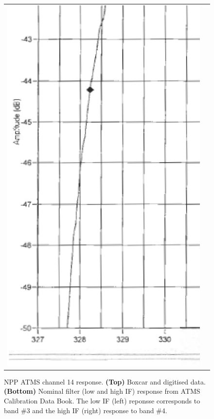 \begin{figure}[H]
\begin{tabular}{c c}
    \includegraphics[bb=249 194 1431 1035,scale=0.2]{graphics/log_book/ch14_hif.eps}
  \end{tabular}
  \caption{NPP ATMS channel 14 response. \textbf{(Top)} Boxcar and digitised data. \textbf{(Bottom)} Nominal filter (low and high IF) response from ATMS Calibration Data Book\cite{ATMS_PFM_CalLog}. The low IF (left) reponsse corresponds to band \#3 and the high IF (right) response to band \#4.}
  \label{fig:atms_npp.ch14.srf}
\end{figure}

